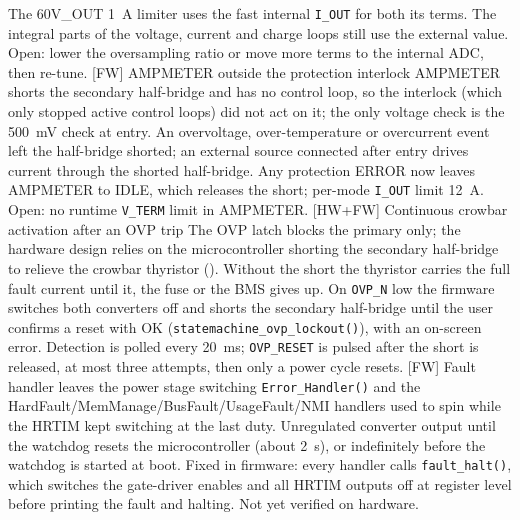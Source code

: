 \begin{FMEATable}
        {The 60V\_OUT \qty{1}{\ampere} limiter uses the fast internal \texttt{I\_OUT} for both its terms. The integral parts of the voltage, current and charge loops still use the external value. Open: lower the oversampling ratio or move more terms to the internal \ac{ADC}, then re-tune. }
    \FMEAItemModerate
        {[FW] AMPMETER outside the protection interlock}
        {AMPMETER shorts the secondary half-bridge and has no control loop, so the interlock (which only stopped active control loops) did not act on it; the only voltage check is the \qty{500}{\milli\volt} check at entry.}
        {An overvoltage, over-temperature or overcurrent event left the half-bridge shorted; an external source connected after entry drives current through the shorted half-bridge.}
        {Any protection ERROR now leaves AMPMETER to IDLE, which releases the short; per-mode \texttt{I\_OUT} limit \qty{12}{\ampere}. Open: no runtime \texttt{V\_TERM} limit in AMPMETER. }
    \FMEAItemModerate
        {[HW+FW] Continuous crowbar activation after an \acs{OVP} trip}
        {The \ac{OVP} latch blocks the primary only; the hardware design relies on the microcontroller shorting the secondary half-bridge to relieve the crowbar thyristor ().}
        {Without the short the thyristor carries the full fault current until it, the fuse or the \ac{BMS} gives up.}
        {On \texttt{OVP\_N} low the firmware switches both converters off and shorts the secondary half-bridge until the user confirms a reset with OK (\texttt{statemachine\_ovp\_lockout()}), with an on-screen error. Detection is polled every \qty{20}{\milli\second}; \texttt{OVP\_RESET} is pulsed after the short is released, at most three attempts, then only a power cycle resets. }
    \FMEAItemModerate
        {[FW] Fault handler leaves the power stage switching}
        {\texttt{Error\_Handler()} and the HardFault/MemManage/BusFault/UsageFault/NMI handlers used to spin while the \ac{HRTIM} kept switching at the last duty.}
        {Unregulated converter output until the watchdog resets the microcontroller (about \qty{2}{\second}), or indefinitely before the watchdog is started at boot.}
        {Fixed in firmware: every handler calls \texttt{fault\_halt()}, which switches the gate-driver enables and all \ac{HRTIM} outputs off at register level before printing the fault and halting. Not yet verified on hardware. }
    \caption{FMEA -- Power conversion} \\
    \end{FMEATable}

